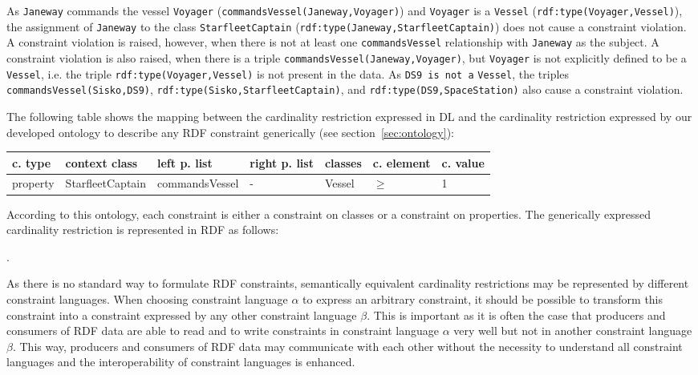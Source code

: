\documentclass{llncs}
\newcommand{\ms}[1]{\texttt{#1}}
\newenvironment{gcotable}{
  \scriptsize
  \sffamily
  \vspace{0.3cm}
	\begin{center}
  \begin{tabular}{l|l|l|l|l|l|l}
  \hline
  \textbf{c. type} & \textbf{context class} & \textbf{left p. list} & \textbf{right p. list} & \textbf{classes} & \textbf{c. element} & \textbf{c. value} \\
  \hline

}{
  \hline
  \end{tabular}
	\end{center}
}
\begin{document}
As \ms{Janeway} commands the vessel \ms{Voyager} (\ms{commandsVessel(Janeway,Voyager)}) and \ms{Voyager} is a \ms{Vessel} (\ms{rdf:type(Voyager,Vessel)}), the assignment of \ms{Janeway} to the class \ms{StarfleetCaptain} (\ms{rdf:type(Janeway,StarfleetCaptain)}) does not cause a constraint violation.
A constraint violation is raised, however, when there is not at least one \ms{commandsVessel} relationship with \ms{Janeway} as the subject. 
A constraint violation is also raised, when there is a triple \ms{commandsVessel(Janeway,Voyager)}, but \ms{Voyager} is not explicitly defined to be a \ms{Vessel}, 
i.e. the triple \ms{rdf:type(Voyager,Vessel)} is not present in the data. 
As \ms{DS9 is not a} \ms{Vessel}, 
the triples \ms{commandsVessel(Sisko,DS9)}, \ms{rdf:type(Sisko,StarfleetCaptain)}, and \ms{rdf:type(DS9,SpaceStation)}  
also cause a constraint violation. 

The following table shows the mapping between the cardinality restriction expressed in DL 
and the cardinality restriction expressed by our developed ontology to describe any RDF constraint generically (see section~\ref{sec:ontology}):

\begin{gcotable}
property & StarfleetCaptain & commandsVessel & - & Vessel & $\geq$ & 1 \\
\end{gcotable}

According to this ontology, each constraint is either a constraint on classes or a constraint on properties.
The generically expressed cardinality restriction is represented in RDF as follows:

\begin{ex}
[   a PropertyConstraint ;
    contextClass StarfleetCaptain ;
    leftProperties ( commandsVessel ) ;
    classes ( Vessel ) ;
    constrainingElement ">=" ;
    constrainingValue 1 ] .
\end{ex}

As there is no standard way to formulate RDF constraints, 
semantically equivalent cardinality restrictions may be represented by different constraint languages. 
When choosing constraint language \ms{$\alpha$} to express an arbitrary constraint, it should be possible to transform this constraint into a constraint expressed by any other constraint language \ms{$\beta$}. 
This is important as it is often the case that producers and consumers of RDF data are able to read and to write constraints in constraint language \ms{$\alpha$} very well but not in another constraint language \ms{$\beta$}. 
This way, producers and consumers of RDF data may communicate with each other without the necessity to understand all constraint languages and the interoperability of constraint languages is enhanced.
\end{document}
